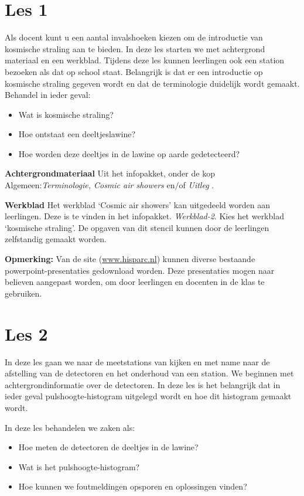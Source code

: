 \section{Les 1}

Als docent kunt u een aantal invalshoeken kiezen om de introductie van
kosmische straling aan te bieden.  In deze les starten we met
achtergrond materiaal en een werkblad. Tijdens deze les kunnen
leerlingen ook een station bezoeken als dat op school staat. Belangrijk
is dat er een introductie op kosmische straling gegeven wordt en dat de
terminologie duidelijk wordt gemaakt.
Behandel in ieder geval:
\begin{itemize}
    \item Wat is kosmische straling?
    \item Hoe ontstaat een deeltjeslawine? 
    \item Hoe worden deze deeltjes in de lawine op aarde gedetecteerd?
\end{itemize}

\textbf{Achtergrondmateriaal}
Uit het infopakket, onder de kop
Algemeen:\textit{Terminologie, Cosmic air showers} en$/$of \textit{ Uitleg \hisparc}.

\textbf{Werkblad} Het werkblad `Cosmic air showers' kan uitgedeeld worden aan
leerlingen. Deze is te vinden in het infopakket.
\textit{Werkblad-2}. Kies het werkblad `kosmische straling'.
De opgaven van dit stencil kunnen door de leerlingen zelfstandig gemaakt worden.

\textbf{Opmerking:}
Van de \hisparc site (\url{www.hisparc.nl}) kunnen diverse bestaande powerpoint-presentaties
gedownload worden.
Deze presentaties mogen naar believen aangepast worden, om door leerlingen en docenten
in de klas te gebruiken.

\section{Les 2}
In deze les gaan we naar de meetstations van \hisparc kijken en met name naar de
afstelling van de detectoren en het onderhoud van een station.
We beginnen met achtergrondinformatie over de detectoren. In deze les is het 
belangrijk dat in ieder geval pulshoogte-histogram uitgelegd wordt en hoe dit histogram
gemaakt wordt.

In deze les behandelen we zaken als:
\begin{itemize}
    \item Hoe meten de detectoren de deeltjes in de lawine?
    \item Wat is het pulshoogte-histogram?
    \item Hoe kunnen we foutmeldingen opsporen en oplossingen vinden?
\end{itemize}

